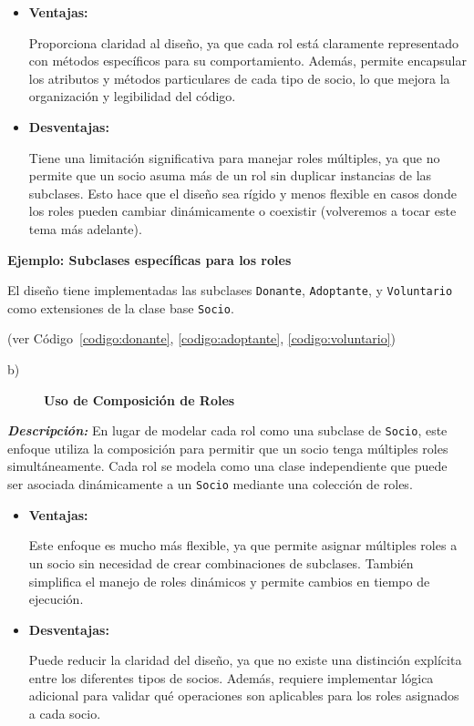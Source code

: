 \begin{itemize}
    \item \textbf{Ventajas:}\par
    Proporciona claridad al diseño, ya que cada rol está claramente representado con 
    métodos específicos para su comportamiento. Además, permite encapsular los atributos y 
    métodos particulares de cada tipo de socio, lo que mejora la organización y legibilidad 
    del código.
    \item \textbf{Desventajas:}\par
    Tiene una limitación significativa para manejar roles múltiples, ya que no permite que 
    un socio asuma más de un rol sin duplicar instancias de las subclases. Esto hace que el 
    diseño sea rígido y menos flexible en casos donde los roles pueden cambiar dinámicamente 
    o coexistir (volveremos a tocar este tema más adelante).
\end{itemize}

\textbf{Ejemplo: Subclases específicas para los roles}\par
El diseño tiene implementadas las subclases \texttt{Donante}, \texttt{Adoptante}, 
y \texttt{Voluntario} como extensiones de la clase base \texttt{Socio}.\par
(ver Código~\ref{codigo:donante}, \ref{codigo:adoptante}, \ref{codigo:voluntario})

\begin{description}
    \item[b)] \textbf{Uso de Composición de Roles}
\end{description}

\textit{\textbf{Descripción:}}  
En lugar de modelar cada rol como una subclase de \texttt{Socio}, este enfoque utiliza 
la composición para permitir que un socio tenga múltiples roles simultáneamente. 
Cada rol se modela como una clase independiente que puede ser asociada dinámicamente a 
un \texttt{Socio} mediante una colección de roles.

\begin{itemize}
    \item \textbf{Ventajas:}\par
    Este enfoque es mucho más flexible, ya que permite asignar múltiples roles a un socio 
    sin necesidad de crear combinaciones de subclases. También simplifica el manejo de 
    roles dinámicos y permite cambios en tiempo de ejecución.
    \item \textbf{Desventajas:}\par
    Puede reducir la claridad del diseño, ya que no existe una distinción explícita entre 
    los diferentes tipos de socios. Además, requiere implementar lógica adicional para 
    validar qué operaciones son aplicables para los roles asignados a cada socio.
\end{itemize}

